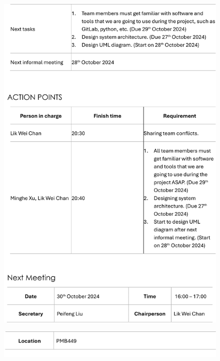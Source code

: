 \documentclass[a4paper,12pt, oneside]{report}
\begin{document}
\begin{appendices}
\begin{figure}[H]
    \includegraphics[width=\textwidth]{Minutes/Minutes_2-cropped-2.png}
\end{figure}
\newpage
\begin{figure}[H]
    \centering
    \includegraphics[width=\textwidth]{Minutes/Minutes_2-cropped-3.png}
\end{figure}

\end{appendices}
\end{document}
